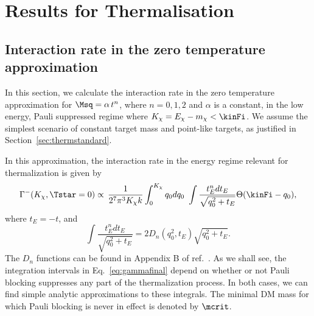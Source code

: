 \chapter{Results for Thermalisation}
\label{app:thermalisation_results}


\section{Interaction rate in the zero temperature approximation}
\label{sec:pauliblockingle}



In this section,  we calculate the interaction rate in the zero temperature approximation for $\Msq = \alpha \, t^n$, where $n=0,1,2$ and $\alpha$ is a constant, in the low energy, Pauli suppressed regime where $K_\chi=E_\chi-m_\chi<\kinFi$. 
We assume the simplest scenario of constant target mass and point-like targets, as justified in Section~\ref{sec:thermstandard}. 

In this approximation, the interaction rate in the energy regime relevant for thermalization is given by~\cite{Bell:2020jou}
\begin{equation}
\Gamma^{-}(K_\chi,\Tstar=0) \propto \, \frac{1}{2^7\pi^3 K_\chi k }  \int_0^{K_\chi} q_0 dq_0 \,\, \int \frac{t_E^n dt_E }{\sqrt{q_0^2+t_E}}\Theta(\kinFi-q_0),
\label{eq:gammafinal}
\end{equation}
where $t_E=-t$,   and 
\begin{equation}
\int \frac{t_E^n dt_E }{\sqrt{q_0^2+t_E}} = 2D_n(q_0^2,t_E)\sqrt{q_0^2+t_E}.
\end{equation}
The $D_n$  functions can be found in Appendix B of  ref.~\cite{Bell:2020jou}. 
As we shall see, the integration intervals in Eq.~\ref{eq:gammafinal} depend on whether or not Pauli blocking suppresses any part of the thermalization process.
In both cases, we can find simple analytic approximations to these integrals. 
The minimal DM mass for which Pauli blocking is never in effect is denoted by $\mcrit$. 

